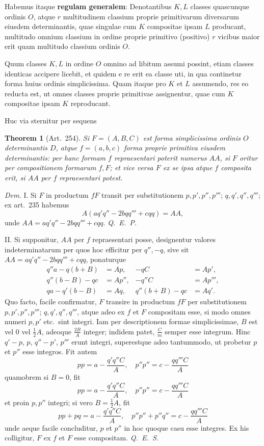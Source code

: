 \documentclass[12pt,a4paper]{article}
\theoremstyle{plain}
\newtheorem{theorem}{Theorem}[section]
\theoremstyle{definition}
\theoremstyle{remark}
\theoremstyle{problemstyle}
\begin{document}
Habemus itaque \textbf{regulam generalem}: Denotantibus $K, L$ classes quascunque ordinis $O$, atque $r$ multitudinem classium proprie primitivarum diversarum eiusdem determinantis, quae singulae cum $K$ compositae ipsam $L$ producant, multitudo omnium classium in ordine proprie primitivo (positivo) $r$ vicibus maior erit quam multitudo classium ordinis $O$.

Quum classes $K, L$ in ordine $O$ omnino ad libitum assumi possint, etiam classes identicas accipere licebit, et quidem e re erit ea classe uti, in qua continetur forma huius ordinis simplicissima. Quam itaque pro $K$ et $L$ assumendo, res eo reducta est, ut omnes classes proprie primitivae assignentur, quae cum $K$ compositae ipsam $K$ reproducant.

Huc via sternitur per sequens

\begin{theorem}[Art.\ 254]
Si $F = (A, B, C)$ est forma simplicissima ordinis $O$ determinantis $D$, atque $f = (a, b, c)$ forma proprie primitiva eiusdem determinantis: per hanc formam $f$ repraesentari poterit numerus $AA$, si $F$ oritur per compositionem formarum $f, F$; et vice versa $F$ ex se ipsa atque $f$ composita erit, si $AA$ per $f$ repraesentari potest.
\end{theorem}

\emph{Dem.} I. Si $F$ in productum $fF$ transit per substitutionem $p, p', p'', p'''$; $q, q', q'', q'''$; ex art.\ 235 habemus
\[
A(aq'q'' - 2bqq''' + cqq) = AA,
\]
unde $AA = aq'q'' - 2bqq''' + cqq$. \emph{Q.\ E.\ P.}

II. Si supponitur, $AA$ per $f$ repraesentari posse, designentur valores indeterminatarum per quos hoc efficitur per $q'', -q$, sive sit $AA = aq'q'' - 2bqq''' + cqq$, ponaturque
\begin{align*}
q''a - q(b + B) &= Ap, & -qC &= Ap', \\
q''(b - B) - qc &= Ap'', & -q''C &= Ap''', \\
qa - q'(b - B) &= Aq, & q''(b + B) - qc &= Aq'.
\end{align*}
Quo facto, facile confirmatur, $F$ transire in productum $fF$ per substitutionem $p, p', p'', p'''$; $q, q', q'', q'''$, atque adeo ex $f$ et $F$ compositam esse, si modo omnes numeri $p, p'$ etc.\ sint integri. Iam per descriptionem formae simplicissimae, $B$ est vel $0$ vel $\tfrac{1}{2}A$, adeoque $\tfrac{2B}{A}$ integer; indidem patet, $\tfrac{C}{m}$ semper esse integrum. Hinc $q' - p$, $p$, $q'' - p'$, $p'''$ erunt integri, superestque adeo tantummodo, ut probetur $p$ et $p''$ esse integros. Fit autem
\[
pp = a - \frac{q'q''C}{A}, \quad p''p'' = c - \frac{qq'''C}{A}
\]
quamobrem si $B = 0$, fit
\[
pp = a - \frac{q'q''C}{A}, \quad p''p'' = c - \frac{qq'''C}{A}
\]
et proin $p, p''$ integri; si vero $B = \tfrac{1}{2}A$, fit
\[
pp + pq = a - \frac{q'q''C}{A}, \quad p''p'' + p''q'' = c - \frac{qq'''C}{A}
\]
unde aeque facile concluditur, $p$ et $p''$ in hoc quoque casu esse integres. Ex his colligitur, $F$ ex $f$ et $F$ esse compositam. \emph{Q.\ E.\ S.}
\end{document}
